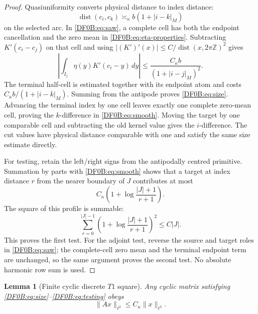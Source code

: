 \documentclass[11pt]{amsart}
\numberwithin{equation}{section}
\newtheorem{lemma}[theorem]{Lemma}
\theoremstyle{definition}
\theoremstyle{remark}
\begin{document}
\begin{proof}
Quasiuniformity converts physical distance to index distance:
\[
 \operatorname {dist}(c_i,c_k)\asymp_\kappa
 b(1+|i-k|_M)
\]
on the selected arc.  In \eqref{DF0B:eq:saw}, a complete cell has both the
endpoint cancellation and the zero mean in
\eqref{DF0B:eq:eta-properties}.  Subtracting $K'(c_i-c_j)$ on that cell and
using $|(K')'(x)|\le C/\operatorname {dist}(x,2\pi\mathbb Z)^2$
gives
\[
 \left|\int_{I_j}\eta(y)K'(c_i-y)\,dy\right|
 \le \frac{C_\kappa b}{(1+|i-j|_M)^2}.
\]
The terminal half-cell is estimated together with its endpoint atom and
costs $C_\kappa b/(1+|i-k|_M)$.  Summing from the antipode proves
\eqref{DF0B:eq:size}.  Advancing the terminal index by one cell leaves exactly
one complete zero-mean cell, proving the $k$-difference in
\eqref{DF0B:eq:smooth}.  Moving the target by one comparable cell and
subtracting the old kernel value gives the $i$-difference.  The cut
values have physical distance comparable with one and satisfy the same
size estimate directly.

For testing, retain the left/right signs from the antipodally centred
primitive.  Summation by parts with \eqref{DF0B:eq:smooth} shows that a target
at index distance $r$ from the nearer boundary of $J$ contributes at
most
\[
 C_\kappa\left(1+\log\frac{|J|+1}{r+1}\right).
\]
The square of this profile is summable:
\[
 \sum_{r=0}^{|J|-1}
 \left(1+\log\frac{|J|+1}{r+1}\right)^2\le C|J|.
\]
This proves the first test.  For the adjoint test, reverse the source and
target roles in \eqref{DF0B:eq:saw}; the complete-cell zero mean and the
terminal endpoint term are unchanged, so the same argument proves the
second test.  No absolute harmonic row sum is used.
\end{proof}

\begin{lemma}[Finite cyclic discrete $T1$ square]
\label{DF0B:lem:T1}
Any cyclic matrix satisfying \eqref{DF0B:eq:size}--\eqref{DF0B:eq:testing} obeys
\begin{equation}\label{DF0B:eq:T1}
 \|Ax\|_{\ell^2}\le C_\kappa\|x\|_{\ell^2}.
\end{equation}
\end{lemma}
\end{document}

